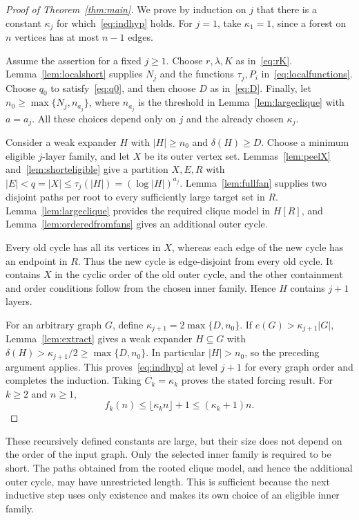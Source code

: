 \documentclass[10pt,letterpaper]{article}
\theoremstyle{definition}
\theoremstyle{remark}
\begin{document}
\begin{proof}[Proof of Theorem~\ref{thm:main}]
We prove by induction on $j$ that there is a constant $\kappa_j$ for which~\eqref{eq:indhyp} holds. For $j=1$, take $\kappa_1=1$, since a forest on $n$ vertices has at most $n-1$ edges.

Assume the assertion for a fixed $j\ge1$. Choose $r,\lambda,K$ as in~\eqref{eq:rK}. Lemma~\ref{lem:localshort} supplies $N_j$ and the functions $\tau_j,P_i$ in~\eqref{eq:localfunctions}. Choose $q_0$ to satisfy~\eqref{eq:q0}, and then choose $D$ as in~\eqref{eq:D}. Finally, let $n_0\ge\max\{N_j,n_{a_j}\}$, where $n_{a_j}$ is the threshold in Lemma~\ref{lem:largeclique} with $a=a_j$. All these choices depend only on $j$ and the already chosen $\kappa_j$.

Consider a weak expander $H$ with $|H|\ge n_0$ and $\delta(H)\ge D$. Choose a minimum eligible $j$-layer family, and let $X$ be its outer vertex set. Lemmas~\ref{lem:peelX} and~\ref{lem:shorteligible} give a partition $X,E,R$ with $|E|<q=|X|\le\tau_j(|H|)=(\log|H|)^{a_j}$. Lemma~\ref{lem:fullfan} supplies two disjoint paths per root to every sufficiently large target set in $R$. Lemma~\ref{lem:largeclique} provides the required clique model in $H[R]$, and Lemma~\ref{lem:orderedfromfans} gives an additional outer cycle.

Every old cycle has all its vertices in $X$, whereas each edge of the new cycle has an endpoint in $R$. Thus the new cycle is edge-disjoint from every old cycle. It contains $X$ in the cyclic order of the old outer cycle, and the other containment and order conditions follow from the chosen inner family. Hence $H$ contains $j+1$ layers.

For an arbitrary graph $G$, define $\kappa_{j+1}=2\max\{D,n_0\}$. If $e(G)>\kappa_{j+1}|G|$, Lemma~\ref{lem:extract} gives a weak expander $H\subseteq G$ with $\delta(H)>\kappa_{j+1}/2\ge\max\{D,n_0\}$. In particular $|H|>n_0$, so the preceding argument applies. This proves~\eqref{eq:indhyp} at level $j+1$ for every graph order and completes the induction. Taking $C_k=\kappa_k$ proves the stated forcing result. For $k\ge2$ and $n\ge1$,
\[
f_k(n)\le\lfloor\kappa_kn\rfloor+1\le(\kappa_k+1)n.
\]
\end{proof}

These recursively defined constants are large, but their size does not depend on the order of the input graph. Only the selected inner family is required to be short. The paths obtained from the rooted clique model, and hence the additional outer cycle, may have unrestricted length. This is sufficient because the next inductive step uses only existence and makes its own choice of an eligible inner family.
\end{document}
